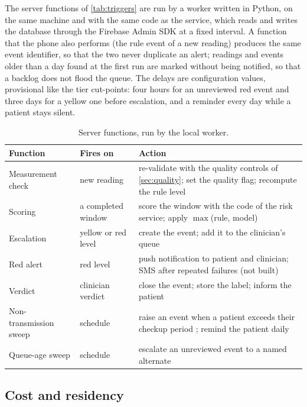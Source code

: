 The server functions of \cref{tab:triggers} are run by a worker written in Python, on the same machine and with the same code as the service, which reads and writes the database through the Firebase Admin SDK at a fixed interval. A function that the phone also performs (the rule event of a new reading) produces the same event identifier, so that the two never duplicate an alert; readings and events older than a day found at the first run are marked without being notified, so that a backlog does not flood the queue. The delays are configuration values, provisional like the tier cut-points: four hours for an unreviewed red event and three days for a yellow one before escalation, and a reminder every day while a patient stays silent.

\begin{table}[htbp]
\centering\footnotesize
\caption{Server functions, run by the local worker.}\label{tab:triggers}\label{tab:modules}
\begin{tabularx}{\textwidth}{@{}>{\raggedright\arraybackslash}p{3.4cm} >{\raggedright\arraybackslash}p{3.0cm} X@{}}
\toprule
\textbf{Function} & \textbf{Fires on} & \textbf{Action} \\
\midrule
Measurement check & new reading & re-validate with the quality controls of \cref{sec:quality}; set the quality flag; recompute the rule level \\
Scoring & a completed window & score the window with the code of the risk service; apply $\max$(rule, model) \\
Escalation & yellow or red level & create the event; add it to the clinician's queue \\
Red alert & red level & push notification to patient and clinician; SMS after repeated failures (not built) \\
Verdict & clinician verdict & close the event; store the label; inform the patient \\
Non-transmission sweep & schedule & raise an event when a patient exceeds their checkup period \parencite{yazdani2018}; remind the patient daily \\
Queue-age sweep & schedule & escalate an unreviewed event to a named alternate \\
\bottomrule
\end{tabularx}
\end{table}

\subsection{Cost and residency}\label{sec:sync}\label{sec:connections}\label{sec:connection-cost}\label{sec:cost}\label{sec:modules}\label{sec:residency-irreversible}

